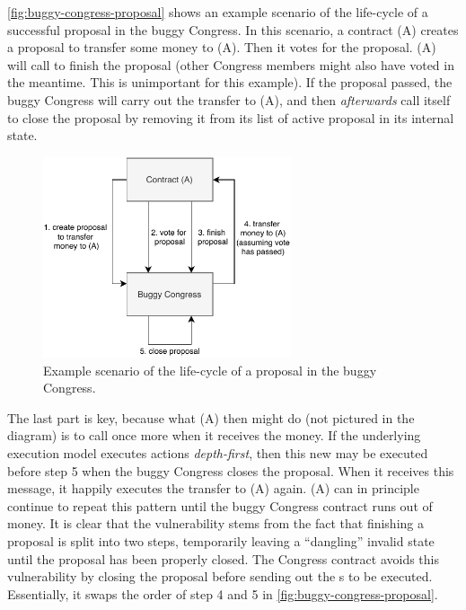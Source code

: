 \documentclass[twoside,11pt,openright]{report}
\begin{document}
\autoref{fig:buggy-congress-proposal} shows an example scenario of the life-cycle of a successful proposal in the buggy Congress. In this scenario, a contract (A) creates a proposal to transfer some money to (A). Then it votes for the proposal. (A) will call to finish the proposal (other Congress members might also have voted in the meantime. This is unimportant for this example). If the proposal passed, the buggy Congress will carry out the transfer to (A), and then \textit{afterwards} call itself to close the proposal by removing it from its list of active proposal in its internal state. 
\begin{figure}[H]
\begin{center}
\includegraphics[width=0.65\textwidth]{media/congress-reentrancy.pdf}
\end{center}
\caption{Example scenario of the life-cycle of a proposal in the buggy Congress.}
\label{fig:buggy-congress-proposal}
\end{figure}
The last part is key, because what (A) then might do (not pictured in the diagram) is to call \finishproposal{} once more when it receives the money. If the underlying execution model executes actions \textit{depth-first}, then this new \finishproposal{} may be executed before step 5 when the buggy Congress closes the proposal. When it receives this message, it happily executes the transfer to (A) again. (A) can in principle continue to repeat this pattern until the buggy Congress contract runs out of money.
It is clear that the vulnerability stems from the fact that finishing a proposal is split into two steps, temporarily leaving a ``dangling'' invalid state until the proposal has been properly closed. The Congress contract avoids this vulnerability by closing the proposal before sending out the \congressAction{}s to be executed. Essentially, it swaps the order of step 4 and 5 in \autoref{fig:buggy-congress-proposal}.
\end{document}
